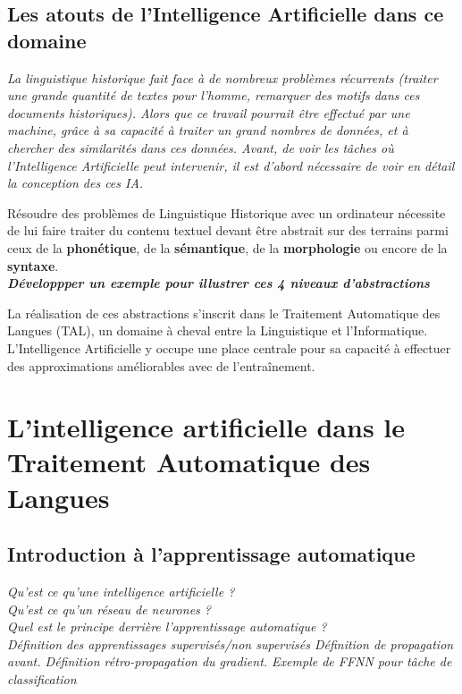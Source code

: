\documentclass[12pt, french, twoside]{report}
\begin{document}
\subsection{Les atouts de l'Intelligence Artificielle dans ce domaine}
\textit{La linguistique historique fait face à de nombreux problèmes récurrents (traiter une grande quantité de textes pour l'homme, remarquer des motifs dans ces documents historiques). Alors que ce travail pourrait être effectué par une machine, grâce à sa capacité à traiter un grand nombres de données, et à chercher des similarités dans ces données. Avant, de voir les tâches où l'Intelligence Artificielle peut intervenir, il est d'abord nécessaire de voir en détail la conception des ces IA.}

Résoudre des problèmes de Linguistique Historique avec un ordinateur nécessite de lui faire traiter
du contenu textuel devant être abstrait sur des terrains parmi ceux de la \textbf{phonétique}, de la
\textbf{sémantique}, de la \textbf{morphologie} ou encore de la \textbf{syntaxe}.\\
\textbf{\textit{Développper un exemple pour illustrer ces 4 niveaux d'abstractions}}

La réalisation de ces abstractions s'inscrit dans le Traitement Automatique des Langues (TAL),
un domaine à cheval entre la Linguistique et l'Informatique. L'Intelligence Artificielle y occupe
une place centrale pour sa capacité à effectuer des approximations améliorables avec de l'entraînement.
\section{L'intelligence artificielle dans le Traitement Automatique des Langues}
\subsection{Introduction à l'apprentissage automatique}
\textit{Qu'est ce qu'une intelligence artificielle ?\\
    Qu'est ce qu'un réseau de neurones ?\\
    Quel est le principe derrière l'apprentissage automatique ?\\
    Définition des apprentissages supervisés/non supervisés
    Définition de propagation avant.
    Définition rétro-propagation du gradient.
    Exemple de FFNN pour tâche de classification}
\end{document}
